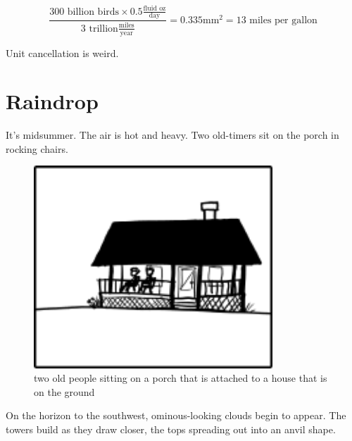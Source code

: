 {\[\frac{300\text{ billion birds}\times 0.5\frac{\text{fluid oz}}{\text{day}}}{3\text{ trillion}\frac{\mathrm{miles}}{\text{year}}}=0.335\mathrm{ mm}^2 = 13\text{ miles per gallon}\]}

{Unit cancellation is weird.}

{
\chapter{Raindrop}
}

\hfill{}

{It’s midsummer. The air is hot and heavy. Two old-timers sit on the porch in rocking chairs.}

\begin{figure}[!htbp]
\centering
\includegraphics[scale=0.5, max width=0.8\textwidth]{imgs/a/12/raindrop_porch.png}
\caption{two old people sitting on a porch that is attached to a house that is on the ground}
\end{figure}

{On the horizon to the southwest, ominous-looking clouds begin to appear. The towers build as they draw closer, the tops spreading out into an anvil shape.}

